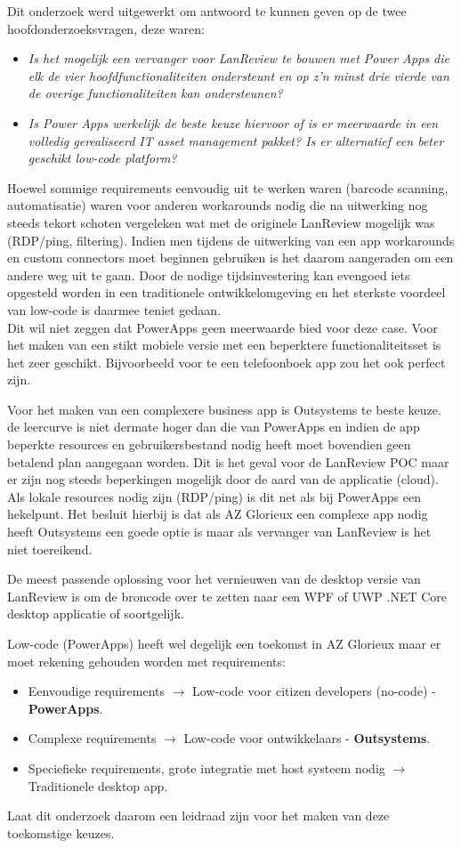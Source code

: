 Dit onderzoek werd uitgewerkt om antwoord te kunnen geven op de twee hoofdonderzoeksvragen, deze waren:
\begin{itemize}
    \item \textit{Is het mogelijk een vervanger voor LanReview te bouwen met Power Apps die elk de vier hoofdfunctionaliteiten ondersteunt en op z'n minst drie vierde van de overige functionaliteiten kan ondersteunen?}
    \item \textit{Is Power Apps werkelijk de beste keuze hiervoor of is er meerwaarde in een volledig gerealiseerd IT asset management pakket? Is er alternatief een beter geschikt low-code platform?}
\end{itemize}

Hoewel sommige requirements eenvoudig uit te werken waren (barcode scanning, automatisatie) waren voor anderen workarounds nodig die na uitwerking nog steeds tekort schoten vergeleken wat met de originele LanReview mogelijk was (RDP/ping, filtering). Indien men tijdens de uitwerking van een app workarounds en custom connectors moet beginnen gebruiken is het daarom aangeraden om een andere weg uit te gaan. Door de nodige tijdsinvestering kan evengoed iets opgesteld worden in een traditionele ontwikkelomgeving en het sterkste voordeel van low-code is daarmee teniet gedaan.\\
Dit wil niet zeggen dat PowerApps geen meerwaarde bied voor deze case. Voor het maken van een stikt mobiele versie met een beperktere functionaliteitsset is het zeer geschikt. Bijvoorbeeld voor te een telefoonboek app zou het ook perfect zijn.

Voor het maken van een complexere business app is Outsystems te beste keuze. de leercurve is niet dermate hoger dan die van PowerApps en indien de app beperkte resources en gebruikersbestand nodig heeft moet bovendien geen betalend plan aangegaan worden. Dit is het geval voor de LanReview POC maar er zijn nog steeds beperkingen mogelijk door de aard van de applicatie (cloud). Als lokale resources nodig zijn (RDP/ping) is dit net als bij PowerApps een hekelpunt. Het besluit hierbij is dat als AZ Glorieux een complexe app nodig heeft Outsystems een goede optie is maar als vervanger van LanReview is het niet toereikend.

De meest passende oplossing voor het vernieuwen van de desktop versie van LanReview is om de broncode over te zetten naar een WPF of UWP .NET Core desktop applicatie of soortgelijk. 

Low-code (PowerApps) heeft wel degelijk een toekomst in AZ Glorieux maar er moet rekening gehouden worden met requirements:
\begin{itemize}
    \item Eenvoudige requirements $\rightarrow$ Low-code voor citizen developers (no-code) - \textbf{PowerApps}.
    \item Complexe requirements $\rightarrow$ Low-code voor ontwikkelaars - \textbf{Outsystems}.
    \item Speciefieke requirements, grote integratie met host systeem nodig $\rightarrow$ Traditionele desktop app.
\end{itemize}

Laat dit onderzoek daarom een leidraad zijn voor het maken van deze toekomstige keuzes.